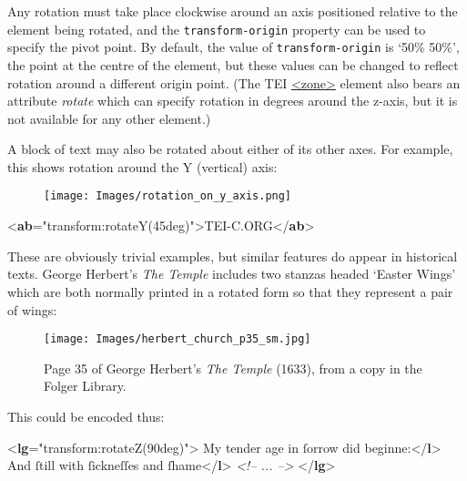 Any rotation must take place clockwise around an axis positioned relative to the element being rotated, and the \texttt{transform-origin} property can be used to specify the pivot point. By default, the value of \texttt{transform-origin} is ‘50\% 50\%’, the point at the centre of the element, but these values can be changed to reflect rotation around a different origin point. (The TEI \hyperref[TEI.zone]{<zone>} element also bears an attribute {\itshape rotate} which can specify rotation in degrees around the z-axis, but it is not available for any other element.)\par
A block of text may also be rotated about either of its other axes. For example, this shows rotation around the Y (vertical) axis: \par
\begin{figure}[htbp]
\noindent\noindent\texttt{[image: Images/rotation\_on\_y\_axis.png]}\end{figure}
\par\bgroup{}\exampleFont \begin{shaded}\noindent\mbox{}{<\textbf{ab}\hspace*{1em}{style}="{transform:rotateY(45deg)}">}TEI-C.ORG{</\textbf{ab}>}\end{shaded}\egroup\par \par
These are obviously trivial examples, but similar features do appear in historical texts. George Herbert's \textit{The Temple} includes two stanzas headed ‘Easter Wings’ which are both normally printed in a rotated form so that they represent a pair of wings:\par
\begin{figure}[htbp]
\noindent\noindent\texttt{[image: Images/herbert\_church\_p35\_sm.jpg]}
\caption{Page 35 of George Herbert's \textit{The Temple} (1633), from a copy in the Folger Library.}\end{figure}
\par
This could be encoded thus: \par\bgroup{}\exampleFont \begin{shaded}\noindent\mbox{}{<\textbf{lg}\hspace*{1em}{style}="{transform:rotateZ(90deg)}">}\mbox{}\newline 
{}My tender age in ſorrow did beginne:{</\textbf{l}>}\mbox{}\newline 
{}And ſtill with ſickneſſes and ſhame{</\textbf{l}>}\mbox{}\newline 
\textit{<!-- ... -->}\mbox{}\newline 
{</\textbf{lg}>}\end{shaded}\egroup\par \par
